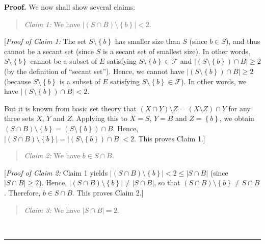 \documentclass[numbers=enddot,12pt,final,onecolumn,notitlepage]{scrartcl}%
\theoremstyle{definition}
\newenvironment{statement}{\begin{quote}}{\end{quote}}
\newenvironment{proof}[1][Proof]{\noindent\textbf{#1.} }{\ \rule{0.5em}{0.5em}}
\renewcommand{\leq}{\leqslant}
\renewcommand{\geq}{\geqslant}
\theoremstyle{plainsl}
\begin{document}
\begin{proof}
We now shall show several claims:

\begin{statement}
\textit{Claim 1:} We have $\left\vert \left(  S\cap B\right)  \setminus
\left\{  b\right\}  \right\vert <2$.
\end{statement}

[\textit{Proof of Claim 1:} The set $S\setminus\left\{  b\right\}  $ has
smaller size than $S$ (since $b\in S$), and thus cannot be a secant set (since
$S$ is a secant set of smallest size). In other words, $S\setminus\left\{
b\right\}  $ cannot be a subset of $E$ satisfying $S\setminus\left\{
b\right\}  \in\mathcal{F}$ and $\left\vert \left(  S\setminus\left\{
b\right\}  \right)  \cap B\right\vert \geq2$ (by the definition of
\textquotedblleft secant set\textquotedblright). Hence, we cannot have
$\left\vert \left(  S\setminus\left\{  b\right\}  \right)  \cap B\right\vert
\geq2$ (because $S\setminus\left\{  b\right\}  $ is a subset of $E$ satisfying
$S\setminus\left\{  b\right\}  \in\mathcal{F}$). In other words, we have
$\left\vert \left(  S\setminus\left\{  b\right\}  \right)  \cap B\right\vert
<2$.

But it is known from basic set theory that $\left(  X\cap Y\right)  \setminus
Z=\left(  X\setminus Z\right)  \cap Y$ for any three sets $X$, $Y$ and $Z$.
Applying this to $X=S$, $Y=B$ and $Z=\left\{  b\right\}  $, we obtain $\left(
S\cap B\right)  \setminus\left\{  b\right\}  =\left(  S\setminus\left\{
b\right\}  \right)  \cap B$. Hence, $\left\vert \left(  S\cap B\right)
\setminus\left\{  b\right\}  \right\vert =\left\vert \left(  S\setminus
\left\{  b\right\}  \right)  \cap B\right\vert <2$. This proves Claim 1.]
\medskip

\begin{statement}
\textit{Claim 2:} We have $b\in S\cap B$.
\end{statement}

[\textit{Proof of Claim 2:} Claim 1 yields $\left\vert \left(  S\cap B\right)
\setminus\left\{  b\right\}  \right\vert <2\leq\left\vert S\cap B\right\vert $
(since $\left\vert S\cap B\right\vert \geq2$). Hence, $\left\vert \left(
S\cap B\right)  \setminus\left\{  b\right\}  \right\vert \neq\left\vert S\cap
B\right\vert $, so that $\left(  S\cap B\right)  \setminus\left\{  b\right\}
\neq S\cap B$. Therefore, $b\in S\cap B$. This proves Claim 2.] \medskip

\begin{statement}
\textit{Claim 3:} We have $\left\vert S\cap B\right\vert =2$.
\end{statement}


\end{proof}
\end{document}
